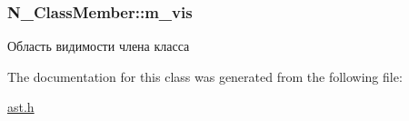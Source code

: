 \hypertarget{classN__ClassMember_ac035d5da0f01fc5323eb9fb3dfdd5bf5}{}
\subsubsection[{m\+\_\+vis}]{ N\+\_\+\+Class\+Member\+::m\+\_\+vis\hspace{0.3cm}{\ttfamily [protected]}}\label{classN__ClassMember_ac035d5da0f01fc5323eb9fb3dfdd5bf5}


Область видимости члена класса 



The documentation for this class was generated from the following file\+:\begin{DoxyCompactItemize}
\item 
\hyperlink{ast_8h}{ast.\+h}\end{DoxyCompactItemize}
